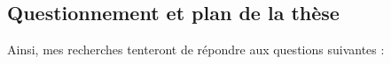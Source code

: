 %
%
%
%
%
\subsection{Questionnement et plan de la thèse}%
\label{sub:plan_de_la_thèse}

Ainsi, mes recherches tenteront de répondre aux questions suivantes :

